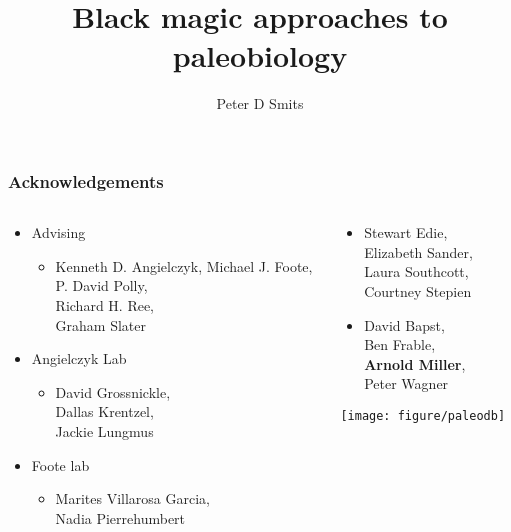 \documentclass{beamer}
\title{Black magic approaches to paleobiology}
\author{Peter D Smits}
\institute{Committee on Evolutionary Biology, University of Chicago}
\date{}
\begin{document}
\begin{frame}
  \maketitle
\end{frame}

\begin{frame}
  \frametitle{Acknowledgements}
  \begin{columns}
    \begin{column}{0.5\textwidth}
      \begin{itemize}
        \item Advising
          \begin{itemize}
            \item Kenneth D. Angielczyk, Michael J. Foote, \\P. David Polly, \\Richard H. Ree, \\Graham Slater
          \end{itemize}
        \item Angielczyk Lab
          \begin{itemize}
            \item {\small{David Grossnickle, \\Dallas Krentzel, \\Jackie Lungmus}}
          \end{itemize}
        \item Foote lab
          \begin{itemize}
            \item {\small{Marites Villarosa Garcia, \\Nadia Pierrehumbert}}
          \end{itemize}
      \end{itemize}
    \end{column}
    \begin{column}{0.5\textwidth}
      \begin{itemize}
        \item {\footnotesize{Stewart Edie, \\Elizabeth Sander, \\Laura Southcott, \\Courtney Stepien}}
        \item {\footnotesize{David Bapst, \\Ben Frable, \\\textbf{Arnold Miller}, \\Peter Wagner}}
      \end{itemize}
      
      \vspace*{0.05\textheight}
      \begin{center}
        \texttt{[image: figure/paleodb]}
      \end{center}
    \end{column}
  \end{columns}
\end{frame}
\end{document}
